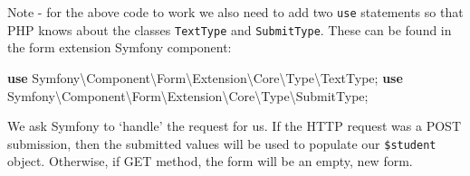 \documentclass[a4paperpaper,openright]{book}
\newenvironment{Shaded}{}{}
\newcommand{\CommentTok}[1]{\textcolor[rgb]{0.38,0.63,0.69}{\textit{#1}}}
\newcommand{\KeywordTok}[1]{\textcolor[rgb]{0.00,0.44,0.13}{\textbf{#1}}}
\newcommand{\NormalTok}[1]{#1}
\newcommand{\OtherTok}[1]{\textcolor[rgb]{0.00,0.44,0.13}{#1}}
\newcommand{\StringTok}[1]{\textcolor[rgb]{0.25,0.44,0.63}{#1}}
\begin{document}
\begin{Shaded}
\end{Shaded}

Note - for the above code to work we also need to add two \texttt{use}
statements so that PHP knows about the classes \texttt{TextType} and
\texttt{SubmitType}. These can be found in the form extension Symfony
component:

\begin{Shaded}
\begin{Highlighting}[]
    \KeywordTok{use}\NormalTok{ Symfony\textbackslash{}Component\textbackslash{}Form\textbackslash{}Extension\textbackslash{}Core\textbackslash{}Type\textbackslash{}TextType}\OtherTok{;}
    \KeywordTok{use}\NormalTok{ Symfony\textbackslash{}Component\textbackslash{}Form\textbackslash{}Extension\textbackslash{}Core\textbackslash{}Type\textbackslash{}SubmitType}\OtherTok{;}
\end{Highlighting}
\end{Shaded}

We ask Symfony to `handle' the request for us. If the HTTP request was a
POST submission, then the submitted values will be used to populate our
\texttt{\$student} object. Otherwise, if GET method, the form will be an
empty, new form.

\begin{Shaded}
\end{Shaded}
\end{document}
